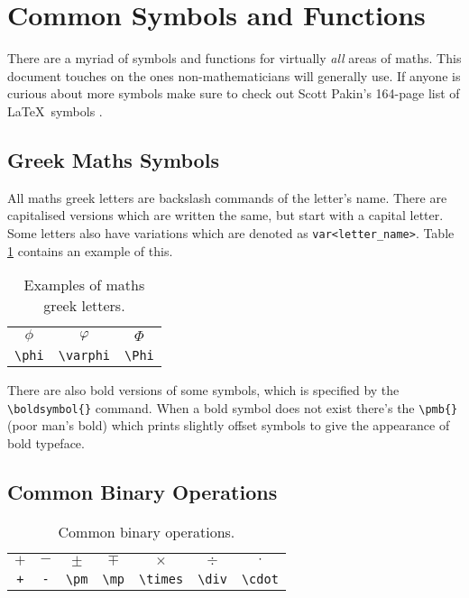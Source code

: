\section{Common Symbols and Functions}
%
There are a myriad of symbols and functions for virtually \emph{all} areas of maths. This document touches on the ones non-mathematicians will generally use. If anyone is curious about more symbols make sure to check out Scott Pakin's 164-page list of \LaTeX~symbols \cite{symbols}.
%
\subsection{Greek Maths Symbols}
%
All maths greek letters are backslash commands of the letter's name. There are capitalised versions which are written the same, but start with a capital letter. Some letters also have variations which are denoted as \verb|var<letter_name>|. Table \ref{t:mg} contains an example of this.
\begin{table}[!htbp]
    \centering
    \caption{Examples of maths greek letters.}
    \label{t:mg}
    \begin{tabular}{ccc}
        $\phi$ & $\varphi$ & $\Phi$\\
        \verb|\phi| & \verb|\varphi| & \verb|\Phi|
    \end{tabular}
\end{table}
There are also bold versions of some symbols, which is specified by the \verb|\boldsymbol{}| command. When a bold symbol does not exist there's the \verb|\pmb{}| (poor man's bold) which prints slightly offset symbols to give the appearance of bold typeface.
%
\subsection{Common Binary Operations}
%
\begin{table}[!htbp]
    \centering
    \caption{Common binary operations.}
    \label{t:bo}
    \begin{tabular}{ccccccc}
        $+$ &   $-$   & $\pm$   &   $\mp$   &   $\times$    &   $\div$  &   $\cdot$ \\
        \verb|+|    &   \verb|-|    &   \verb|\pm|  &   \verb|\mp|  &   \verb|\times|   &   \verb|\div| &   \verb|\cdot|    \\
    \end{tabular}
\end{table}
%
